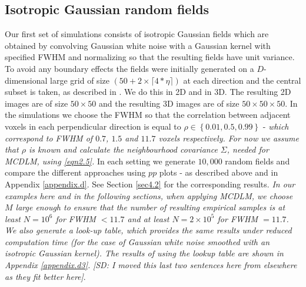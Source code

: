 \documentclass{article}
\newcommand{\sdcom}[1]{\textit{\color{red} [SD: #1]}}
\newcommand{\nt}[1]{\textit{\color{red} #1}}
\begin{document}
\subsection{Isotropic Gaussian random fields}
\label{sec3.1}
Our first set of simulations consists of isotropic Gaussian fields which are obtained by convolving Gaussian white noise with a Gaussian kernel with specified FWHM and normalizing so that the resulting fields have unit variance. To avoid any boundary effects the fields were initially generated on a $D$-dimensional large grid of size $\left(50 + 2\times \lceil 4*\eta\rceil\right)$ at each direction and the central subset is taken, as described in \cite{davenport2020selective}. We do this in 2D and in 3D. The resulting 2D images are of size $50 \times 50$ and the resulting 3D images are of size $50 \times 50 \times 50$. In the simulations we choose the FWHM so that the correlation between adjacent voxels in each perpendicular direction is equal to $\rho \in \left\lbrace 0.01, 0.5, 0.99 \right \rbrace$ - \nt{which correspond to FWHM of $0.7$, $1.5$ and $11.7$ voxels respectively. For now we assume that $\rho$ is known and calculate the neighbourhood covariance $\Sigma$, needed for MCDLM, using \eqref{eqn2.5}.} In each setting we generate $10{,}000$ random fields and compare the different approaches using $pp$ plots - as described above and in Appendix \ref{appendix.d}. See Section \ref{sec4.2} for the corresponding results. \nt{In our examples here and in the following sections, when applying MCDLM, we choose $M$ large enough to ensure that the number of resulting empirical samples is at least $N = 10^6$ for FWHM $< 11.7$ and at least $N = 2\times 10^5$ for FWHM $= 11.7$. We also generate a look-up table, which provides the same results under reduced computation time (for the case of Gaussian white noise smoothed with an isotropic Gaussian kernel). The results of using the lookup table are shown in Appendix \ref{appendix.d3}.} \sdcom{I moved this last two sentences here from elsewhere as they fit better here}.
\end{document}

